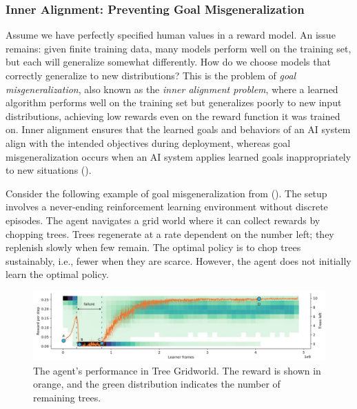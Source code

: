 \documentclass[
  letterpaper,
  DIV=11,
  numbers=noendperiod,
  oneside]{scrreprt}
\theoremstyle{remark}
\begin{document}
\subsubsection{Inner Alignment: Preventing Goal
Misgeneralization}\label{inner-alignment-preventing-goal-misgeneralization}

Assume we have perfectly specified human values in a reward model. An
issue remains: given finite training data, many models perform well on
the training set, but each will generalize somewhat differently. How do
we choose models that correctly generalize to new distributions? This is
the problem of \emph{goal misgeneralization}, also known as the
\emph{inner alignment problem}, where a learned algorithm performs well
on the training set but generalizes poorly to new input distributions,
achieving low rewards even on the reward function it was trained on.
Inner alignment ensures that the learned goals and behaviors of an AI
system align with the intended objectives during deployment, whereas
goal misgeneralization occurs when an AI system applies learned goals
inappropriately to new situations
().

Consider the following example of goal misgeneralization from
(). The setup involves a
never-ending reinforcement learning environment without discrete
episodes. The agent navigates a grid world where it can collect rewards
by chopping trees. Trees regenerate at a rate dependent on the number
left; they replenish slowly when few remain. The optimal policy is to
chop trees sustainably, i.e., fewer when they are scarce. However, the
agent does not initially learn the optimal policy.

\begin{figure}

{\centering \includegraphics{src/Figures/tree-gridworld.jpeg}

}

\caption{The agent's performance in Tree Gridworld. The reward is shown
in orange, and the green distribution indicates the number of remaining
trees.}

\end{figure}%
\end{document}
